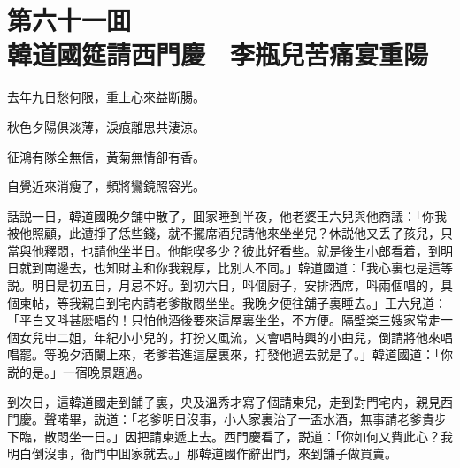 
\chapter*{第六十一囬　\\韓道國筵請西門慶　李瓶兒苦痛宴重陽}


\begin{myquote}
去年九日愁何限，重上心來益断腸。

秋色夕陽俱淡薄，淚痕離思共淒涼。

征鴻有隊全無信，黃菊無情卻有香。

自覺近來消瘦了，頻將鸞鏡照容光。
\end{myquote}

話説一日，韓道國晚夕舖中散了，囬家睡到半夜，他老婆王六兒與他商議：「你我被他照顧，此遭掙了恁些錢，就不擺席酒兒請他來坐坐兒？休説他又丢了孩兒，只當與他釋悶，也請他坐半日。他能喫多少？彼此好看些。就是後生小郎看着，到明日就到南邊去，也知財主和你我親厚，比別人不同。」韓道國道：「我心裏也是這等説。明日是初五日，月忌不好。到初六日，呌個廚子，安排酒席，呌兩個唱的，具個柬帖，等我親自到宅内請老爹散悶坐坐。我晚夕便往舖子裏睡去。」王六兒道：「平白又呌甚麽唱的！只怕他酒後要來這屋裏坐坐，不方便。隔壁楽三嫂家常走一個女兒申二姐，年紀小小兒的，打扮又風流，又會唱時興的小曲兒，倒請將他來唱唱罷。等晚夕酒闌上來，老爹若進這屋裏來，打發他過去就是了。」韓道國道：「你説的是。」一宿晚景題過。

到次日，這韓道國走到舖子裏，央及溫秀才寫了個請柬兒，走到對門宅内，親見西門慶。聲喏畢，説道：「老爹明日沒事，小人家裏治了一盃水酒，無事請老爹貴步下臨，散悶坐一日。」因把請柬遞上去。西門慶看了，説道：「你如何又費此心？我明白倒沒事，衙門中囬家就去。」那韓道國作辭出門，來到舖子做買賣。

